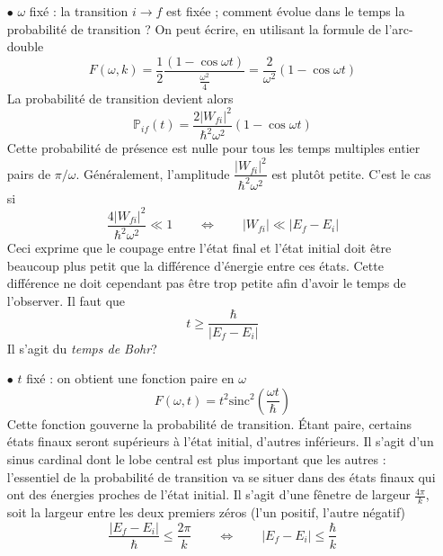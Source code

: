 		\begin{itemize}
		\item[$\bullet$] $\omega$ fixé : la transition $i\rightarrow f$ est fixée ; comment évolue 
		dans le temps la probabilité de transition ? On peut écrire, en utilisant la formule de l'arc-double
		\begin{equation}
		F(\omega,k) = \frac{1}{2}\dfrac{(1-\cos\omega t)}{\frac{\omega^2}{4}} = \dfrac{2}{\omega^2}
		(1-\cos\omega t)
		\end{equation}
		La probabilité de transition devient alors
		\begin{equation}
		\mathbb{P}_{if}(t) = \dfrac{2|W_{fi}|^2}{\hbar^2\omega^2}(1-\cos\omega t)
		\end{equation}
		Cette probabilité de présence est nulle pour tous les temps multiples entier pairs de $\pi/\omega$.
		Généralement, l'amplitude $ \dfrac{|W_{fi}|^2}{\hbar^2\omega^2}$ est plutôt petite. C'est le cas si
		\begin{equation}
		 \dfrac{4|W_{fi}|^2}{\hbar^2\omega^2} \ll 1\qquad\Leftrightarrow\qquad |W_{fi}|\ll |E_f-E_i|
		\end{equation}
		Ceci exprime que le coupage entre l'état final et l'état initial doit être beaucoup plus petit 
		que la différence d'énergie entre ces états. Cette différence ne doit cependant pas être 
		trop petite afin d'avoir le temps de l'observer. Il faut que
		\begin{equation}
		t \geq \dfrac{\hbar}{|E_f-E_i|}
		\end{equation}
		Il s'agit du \textit{temps de Bohr}?
		
		
		
		\item[$\bullet$] $t$ fixé : on obtient une fonction paire en $\omega$
		\begin{equation}
		F(\omega,t) = t^2 \text{sinc}^2\left(\frac{\omega t}{\hbar}\right)
		\end{equation}
		Cette fonction gouverne la probabilité de transition. Étant paire, certains états finaux seront 
		supérieurs à l'état initial, d'autres inférieurs.  Il s'agit d'un sinus cardinal dont le lobe 
		central est plus important que les autres : l'essentiel de la probabilité de transition va 
		se situer dans des états finaux qui ont des énergies proches de l'état initial. Il s'agit 
		d'une fênetre de largeur $\frac{4\pi}{k}$, soit la largeur entre les deux premiers zéros (l'un 
		positif, l'autre négatif)
		\begin{equation}
		\dfrac{|E_f-E_i|}{\hbar}\leq \frac{2\pi}{k}\qquad\Leftrightarrow\qquad |E_f-E_i|\leq \dfrac{\hbar}{
		k}
		\end{equation}
		\end{itemize}
		
